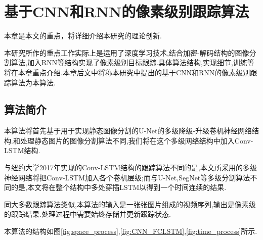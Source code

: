 
\chapter{基于CNN和RNN的像素级别跟踪算法}
本章是本文的重点，将详细介绍本研究的理论创新.
\par
本研究所作的重点工作实际上是运用了深度学习技术,结合加密-解码结构的图像分割算法,加入RNN等结构实现了像素级别目标跟踪.具体算法结构,实现细节,训练等将在本章重点介绍.本章后文中将称本研究中提出的基于CNN和RNN的像素级别跟踪算法为本算法.

\section{算法简介}
本算法将首先基于用于实现静态图像分割的U-Net\supercite{ronneberger2015u}的多级降级-升级卷机神经网络结构.和处理静态图片的图像分割算法不同,我们将在这个多级网络结构中加入Conv-LSTM结构.
\par
与纽约大学2017年实现的Conv-LSTM结构的跟踪算法不同的是,本文所采用的多级神经网络将把Conv-LSTM加入各个卷机层级;而与U-Net,SegNet等多级分割算法不同的是,本文将在整个结构中多处穿插LSTM以得到一个时间连续的结果.
\par
同大多数跟踪算法类似,本算法的输入是一张张图片组成的视频序列,输出是像素级的跟踪结果.处理过程中需要始终存储并更新跟踪状态.
\par
本算法的结构如图\ref{fig:space_process},\ref{fig:CNN_FCLSTM},\ref{fig:time_process}所示.

